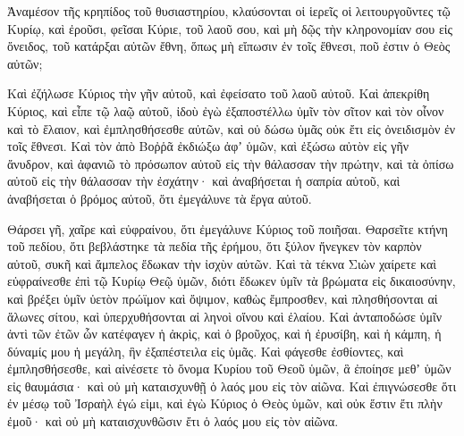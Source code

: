 {Ἀναμέσον τῆς κρηπίδος τοῦ θυσιαστηρίου, κλαύσονται οἱ ἱερεῖς οἱ λειτουργοῦντες τῷ Κυρίῳ, καὶ ἐροῦσι, φεῖσαι Κύριε, τοῦ λαοῦ σου, καὶ μὴ δῷς τὴν κληρονομίαν σου εἰς ὄνειδος, τοῦ κατάρξαι αὐτῶν ἔθνη, ὅπως μὴ εἴπωσιν ἐν τοῖς ἔθνεσι, ποῦ ἐστιν ὁ Θεὸς αὐτῶν;
\par }{\PP {}Καὶ ἐζήλωσε Κύριος τὴν γῆν αὐτοῦ, καὶ ἐφείσατο τοῦ λαοῦ αὐτοῦ.
Καὶ ἀπεκρίθη Κύριος, καὶ εἶπε τῷ λαῷ αὐτοῦ, ἰδοὺ ἐγὼ ἐξαποστέλλω ὑμῖν τὸν σῖτον καὶ τὸν οἶνον καὶ τὸ ἔλαιον, καὶ ἐμπλησθήσεσθε αὐτῶν, καὶ οὐ δώσω ὑμᾶς οὐκ ἔτι εἰς ὀνειδισμὸν ἐν τοῖς ἔθνεσι.
Καὶ τὸν ἀπὸ Βοῤῥᾶ ἐκδιώξω ἀφʼ ὑμῶν, καὶ ἐξώσω αὐτὸν εἰς γῆν ἄνυδρον, καὶ ἀφανιῶ τὸ πρόσωπον αὐτοῦ εἰς τὴν θάλασσαν τὴν πρώτην, καὶ τὰ ὀπίσω αὐτοῦ εἰς τὴν θάλασσαν τὴν ἐσχάτην· καὶ ἀναβήσεται ἡ σαπρία αὐτοῦ, καὶ ἀναβήσεται ὁ βρόμος αὐτοῦ, ὅτι ἐμεγάλυνε τὰ ἔργα αὐτοῦ.
\par }{\PP {}Θάρσει γῆ, χαῖρε καὶ εὐφραίνου, ὅτι ἐμεγάλυνε Κύριος τοῦ ποιῆσαι.
Θαρσεῖτε κτήνη τοῦ πεδίου, ὅτι βεβλάστηκε τὰ πεδία τῆς ἐρήμου, ὅτι ξύλον ἤνεγκεν τὸν καρπὸν αὐτοῦ, συκῆ καὶ ἄμπελος ἔδωκαν τὴν ἰσχὺν αὐτῶν.
Καὶ τὰ τέκνα Σιὼν χαίρετε καὶ εὐφραίνεσθε ἐπὶ τῷ Κυρίῳ Θεῷ ὑμῶν, διότι ἔδωκεν ὑμῖν τὰ βρώματα εἰς δικαιοσύνην, καὶ βρέξει ὑμῖν ὑετὸν πρώϊμον καὶ ὄψιμον, καθὼς ἔμπροσθεν,
καὶ πλησθήσονται αἱ ἅλωνες σίτου, καὶ ὑπερχυθήσονται αἱ ληνοὶ οἴνου καὶ ἐλαίου.
Καὶ ἀνταποδώσε ὑμῖν ἀντὶ τῶν ἐτῶν ὧν κατέφαγεν ἡ ἀκρὶς, καὶ ὁ βροῦχος, καὶ ἡ ἐρυσίβη, καὶ ἡ κάμπη, ἡ δύναμίς μου ἡ μεγάλη, ἣν ἐξαπέστειλα εἰς ὑμᾶς.
Καὶ φάγεσθε ἐσθίοντες, καὶ ἐμπλησθήσεσθε, καὶ αἰνέσετε τὸ ὄνομα Κυρίου τοῦ Θεοῦ ὑμῶν, ἃ ἐποίησε μεθʼ ὑμῶν εἰς θαυμάσια· καὶ οὐ μὴ καταισχυνθῇ ὁ λαός μου εἰς τὸν αἰῶνα.
Καὶ ἐπιγνώσεσθε ὅτι ἐν μέσῳ τοῦ Ἰσραὴλ ἐγώ εἰμι, καὶ ἐγὼ Κύριος ὁ Θεὸς ὑμῶν, καὶ οὐκ ἕστιν ἔτι πλὴν ἐμοῦ· καὶ οὐ μὴ καταισχυνθῶσιν ἔτι ὁ λαός μου εἰς τὸν αἰῶνα.

\par }
